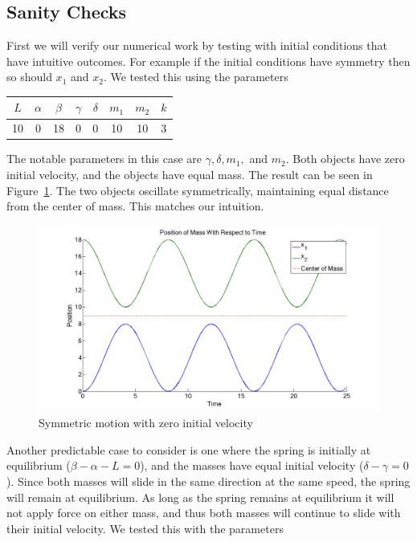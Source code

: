 \documentclass[11pt, oneside]{article}   	%
\begin{document}
\subsection{Sanity Checks}
First we will verify our numerical work by testing with initial conditions that have intuitive outcomes. For example if the initial conditions have symmetry then so should $x_1$ and $x_2$. We tested this using the parameters
\begin{center}

\begin{tabular}{| c | c | c | c | c | c | c | c |}

\hline

$L$ & $\alpha$ & $\beta$ & $\gamma$ & $\delta$ & $m_1$ & $m_2$ & $k$ \\

\hline

 10 & 0 & 18 & 0 & 0 & 10 & 10 & 3\\

\hline

\end{tabular}

\end{center}

The notable parameters in this case are $\gamma, \delta, m_1, $ and $m_2$.
Both objects have zero initial velocity, and the objects have equal mass.
The result can be seen in Figure~\ref{sanity1}.
The two objects oscillate symmetrically, maintaining equal distance from the center of mass.
This matches our intuition.

\begin{figure}[h!]
\centering \includegraphics[scale=0.3]{sanity1}
\caption{\label{sanity1} Symmetric motion with zero initial velocity}
\end{figure}

Another predictable case to consider is one where the spring is initially at equilibrium ($\beta - \alpha - L = 0$), and the masses have equal initial velocity ($\delta-\gamma=0$).
Since both masses will slide in the same direction at the same speed, the spring will remain at equilibrium. As long as the spring remains at equilibrium it will not apply force on either mass, and thus both masses will continue to slide with their initial velocity.
We tested this with the parameters
\end{document}
